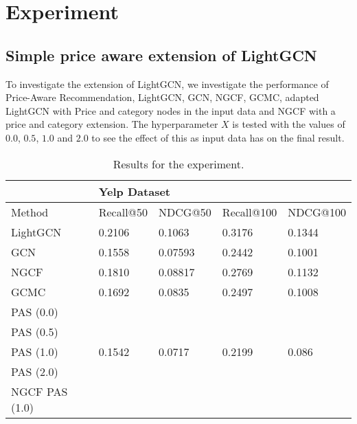 \section{Experiment}


\subsection{Simple price aware extension of LightGCN}
To investigate the extension of LightGCN, we investigate the performance of Price-Aware Recommendation, LightGCN, GCN, NGCF, GCMC, adapted LightGCN with Price and category nodes in the input data and NGCF with a price and category extension.
The hyperparameter $X$ is tested with the values of $0.0$, $0.5$, $1.0$ and $2.0$ to see the effect of this as input data has on the final result.
\begin{table*}[h!]
    \centering
    \begin{tabular}{|l|l|l|l|l|}
        \hline
        \rowcolor[HTML]{FFFFFF}
                       & \multicolumn{4}{l|}{\cellcolor[HTML]{FFFFFF}Yelp Dataset}                                   \\ \hline
        Method         & Recall@50                                                 & NDCG@50 & Recall@100 & NDCG@100 \\ \hline
        LightGCN       & 0.2106                                                    & 0.1063  & 0.3176     & 0.1344   \\ \hline
        GCN            & 0.1558                                                    & 0.07593 & 0.2442     & 0.1001   \\ \hline
        NGCF           & 0.1810                                                    & 0.08817 & 0.2769     & 0.1132   \\ \hline
        GCMC           & 0.1692                                                    & 0.0835  & 0.2497     & 0.1008   \\ \hline
        PAS (0.0)      &                                                           &         &            &          \\ \hline
        PAS (0.5)      &                                                           &         &            &          \\ \hline
        PAS (1.0)      & 0.1542                                                    & 0.0717  & 0.2199     & 0.086    \\ \hline
        PAS (2.0)      &                                                           &         &            &          \\ \hline
        NGCF PAS (1.0) &                                                           &         &            &          \\ \hline
    \end{tabular}
    \caption{Results for the experiment.}
    \label{tab:results}
\end{table*}
